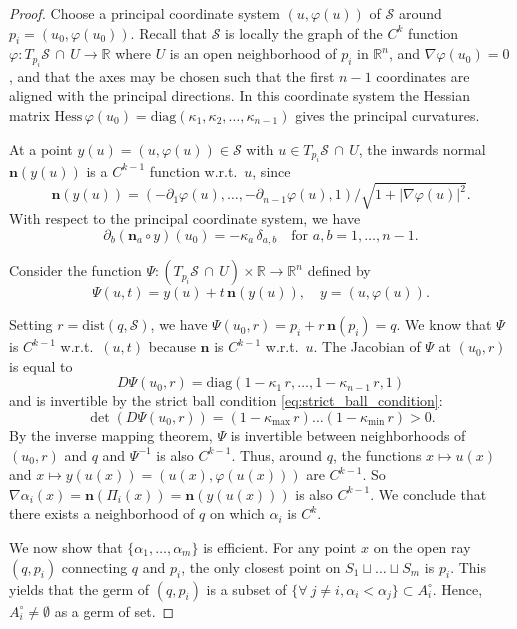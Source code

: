 \documentclass[11pt]{article}
\newcommand{\R}{\mathbb{R}}
\newcommand{\nbf}{\mathbf{n}}
\newcommand{\kap}{\kappa}
\newcommand{\kapmax}{\kappa_{\text{max}}}
\newcommand{\kapmin}{\kappa_{\text{min}}}
\newcommand{\inter}{\cap}
\newcommand{\dist}{\mathrm{dist}}
\newcommand{\Surf}{\mathcal{S}}
\newcommand{\grad}{\nabla}
\newcommand{\Hess}{\mathrm{Hess}}
\theoremstyle{plain}
\theoremstyle{definition}
\theoremstyle{remark}
\begin{document}
\begin{proof}
		Choose a principal coordinate system $(u,\varphi(u))$ of $\Surf$ around $p_i = (u_0, \varphi(u_0))$. Recall that $\Surf$ is locally the graph of the $C^k$ function $\varphi : T_{p_i}\Surf \, \inter \, U \to \R$ where $U$ is an open neighborhood of $p_i$ in $\R^n$, and $\grad \varphi(u_0) = 0$, and that the axes may be chosen such that the first $n-1$ coordinates are aligned with the principal directions. In this coordinate system the Hessian matrix $\Hess \, \varphi(u_0) = \text{diag}\left( \kap_1,\kap_2,\ldots,\kap_{n-1} \right)$ gives the principal curvatures.
		
		At a point $y(u) = (u, \varphi(u)) \in \Surf$ with $u \in T_{p_i}\Surf \, \inter \, U$, the inwards normal $\nbf(y(u))$ is a $C^{k-1}$ function w.r.t.~$u$, since
		\[ \nbf(y(u)) = \left(-\partial_1 \varphi(u),\ldots, -\partial_{n-1} \varphi(u), 1 \right) /  \sqrt{1 + |\grad \varphi (u)|^2}.\]
		With respect to the principal coordinate system, we have
		\[\partial_b( \nbf_a \circ y)(u_0) = - \kap_a \, \delta_{a,b} \quad \text{for } a,b = 1,\ldots, n-1.\]
		
		Consider the function $\Psi : (T_{p_i}\Surf \, \inter \, U) \times \R \to \R^n$ defined by
		\begin{equation}\label{eq:from_piece_to_distlevel}
			\Psi(u, t) = y(u) + t \, \nbf(y(u)), \quad y = (u, \varphi(u)).
		\end{equation}
		
		Setting $r = \dist(q,\Surf)$, we have $\Psi(u_0,r) = p_i + r \, \nbf(p_i) = q$.
		We know that $\Psi$ is $C^{k-1}$ w.r.t.~$(u,t)$ because $\nbf$ is $C^{k-1}$ w.r.t.~$u$. The Jacobian of $\Psi$ at $(u_0,r)$ is equal to 
		\[D\Psi(u_0,r) = \text{diag}\left(1-\kap_1 \, r, \ldots, 1-\kap_{n-1} \, r, 1 \right)\]
		and is invertible by the strict ball condition \eqref{eq:strict_ball_condition}:
		\[\det(D\Psi(u_0,r)) = (1-\kapmax \, r) \ldots (1-\kapmin \, r) > 0.\]
		By the inverse mapping theorem, $\Psi$ is invertible between neighborhoods of $(u_0,r)$ and $q$ and $\Psi^{-1}$ is also $C^{k-1}$. Thus, around $q$, the functions $x \mapsto u(x)$ and $x \mapsto y(u(x)) = (u(x), \varphi(u(x)))$ are $C^{k-1}$. So $\grad \alpha_i(x) = \nbf(\Pi_i(x)) = \nbf(y(u(x)))$ is also $C^{k-1}$. We conclude that there exists a neighborhood of $q$ on which $\alpha_i$ is $C^k$.
		
		We now show that $\{\alpha_1,\ldots,\alpha_m\}$ is efficient. 
		For any point $x$ on the open ray $(q,p_i)$ connecting $q$ and $p_i$,
		the only closest point on $S_1 \sqcup \ldots \sqcup S_m$ is $p_i$.
		This yields that the germ of $(q,p_i)$ 
		is a subset of $\{\forall\ j \neq i, \alpha_i < \alpha_j \} \subset A_i^\circ$. Hence, $A_i^\circ \neq \emptyset$ as a germ of set.  
		

\end{proof}
\end{document}
